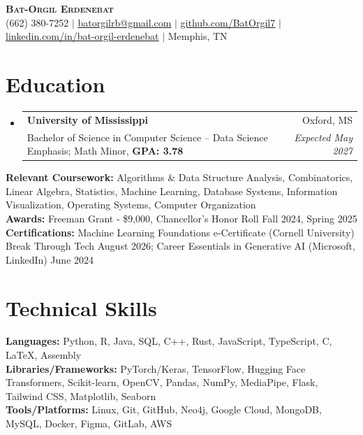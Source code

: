\documentclass[letterpaper,11pt]{article}
\makeatletter
\newcommand{\resumeEducationSubheading}[4]{
  \vspace{-2pt}\item
    \begin{tabular*}{0.97\textwidth}[t]{l@{\extracolsep{\fill}}r}
      \textbf{#1} & #2 \\
      {\small#3} & \textit{\small #4} \\
    \end{tabular*}\vspace{-7pt}
}
\newcommand{\resumeSubHeadingListStart}{\begin{itemize}[leftmargin=0.1in, label={}]}
\newcommand{\resumeSubHeadingListEnd}{\end{itemize}}
\makeatother
\begin{document}
\begin{center}
    \textbf{\Huge \scshape\textbf{\Large Bat-Orgil Erdenebat }} \\ \vspace{1pt}
    \small (662) 380-7252 $|$ \href{mailto:batorgilrb@gmail.com}{\underline{batorgilrb@gmail.com}} $|$ 
    \href{https://github.com/BatOrgil7}{\underline{github.com/BatOrgil7}} $|$ {\underline{\href{https://linkedin.com/in/bat-orgil-erdenebat}{linkedin.com/in/bat-orgil-erdenebat}}} $|$ {{Memphis, TN}}
\end{center}


\section{Education}
  \resumeSubHeadingListStart
    \resumeEducationSubheading
      {University of Mississippi}{Oxford, MS}
      {Bachelor of Science in Computer Science – Data Science Emphasis; Math Minor, \textbf{GPA: 3.78}}{\textnormal{Expected May 2027}} 
    \resumeSubHeadingListEnd
    \begin{itemize}[leftmargin=0.20in, label={}]
    \small{\item{
    \textbf{Relevant Coursework:} Algorithms \& Data Structure Analysis, Combinatorics, Linear Algebra, Statistics, Machine Learning, Database Systems, Information Visualization, Operating Systems, Computer Organization \\
    \textbf{Awards:} Freeman Grant - \$9,000, Chancellor's Honor Roll Fall 2024, Spring 2025 \\
    \textbf{Certifications:} Machine Learning Foundations e-Certificate (Cornell University) Break Through Tech August 2026; Career Essentials in Generative AI (Microsoft, LinkedIn) June 2024
    }}
  \end{itemize}
  

\section{Technical Skills}
 \begin{itemize}[leftmargin=0.20in, label={}]
    \small{\item{
     \textbf{Languages:} Python, R, Java, SQL, C++, Rust, JavaScript, TypeScript, C, LaTeX, Assembly\\
     \textbf{Libraries/Frameworks:} PyTorch/Keras, TensorFlow, Hugging Face Transformers, Scikit-learn, OpenCV, Pandas, NumPy, MediaPipe, Flask, Tailwind CSS, Matplotlib, Seaborn \\
     \textbf{Tools/Platforms:} Linux, Git, GitHub, Neo4j, Google Cloud, MongoDB, MySQL, Docker, Figma, GitLab, AWS
    }}
  \end{itemize}
\end{document}
